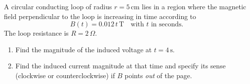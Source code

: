 \documentclass[11pt,a4paper]{article}
\newcounter{exercise}
\newenvironment{exercise}[1][]
  {\refstepcounter{exercise}%
   \begin{tcolorbox}[enhanced, breakable, width=\textwidth,
     colback=blue!5!white,colframe=blue!60!black,
     fonttitle=\bfseries\large,
     title=Exercise~\theexercise:~#1]}
  {\end{tcolorbox}}
\newif\ifshowsolutions
\newenvironment{solution}
  {\ifshowsolutions
     \begin{tcolorbox}[enhanced, breakable, width=\textwidth,
       colback=green!5!white,colframe=green!50!black,
       fonttitle=\bfseries\large,
       title=Solution]}
  {\end{tcolorbox}\fi}
\begin{document}
\begin{exercise}[Faraday's Law: Time-varying Field]
A circular conducting loop of radius $r=5\,\text{cm}$ lies in a region where the magnetic field perpendicular to the loop is increasing in time according to
\[
B(t) = 0.012\,t\,\text{T}\quad\text{with }t\text{ in seconds.}
\]
The loop resistance is $R = 2\,\Omega$.  

\begin{enumerate}[label=\alph*)]
  \item Find the magnitude of the induced voltage at $t=4\,\text{s}$.
  \item Find the induced current magnitude at that time and specify its sense (clockwise or counterclockwise) if $B$ points \emph{out} of the page.
\end{enumerate}
\end{exercise}

\ifshowsolutions
\begin{solution}
Magnetic flux through the loop is $\Phi(t)=B(t) \cdot \pi r^{2}$. Faraday's law gives the induced voltage magnitude
\[
|V| = \left|\frac{d\Phi}{dt}\right| = \pi r^{2} \cdot \left|\frac{dB}{dt}\right|.
\]
Here $dB/dt$ is constant because $B(t) = 0.012\,t\,\text{T}$.

\begin{enumerate}[label=\alph*)]
\item Magnitude: Radius $r=0.05\,\text{m}$ and $dB/dt=0.012\ \mathrm{T/s}$. Thus
\[
|V|=\pi \cdot 0.05^2 \cdot 0.012\,\mathrm{V} \approx 9.42\times10^{-5}\,\mathrm{V}.
\]

\item Induced current and direction: According to Ohm's law
\[
I = |V|/R = \frac{9.42 \times 10^-5}{2}\,\mathrm{A} \approx 4.71 \times 10^{-5}\,\mathrm{A}.
\]
Direction: since $B$ is increasing \emph{out} of the page, the induced magnetic field must oppose the increase and therefore be \emph{into} the page. A magnetic field into the page corresponds to a \textbf{clockwise} induced current (viewed by the observer).
\end{enumerate}
\end{solution}
\fi
\end{document}
